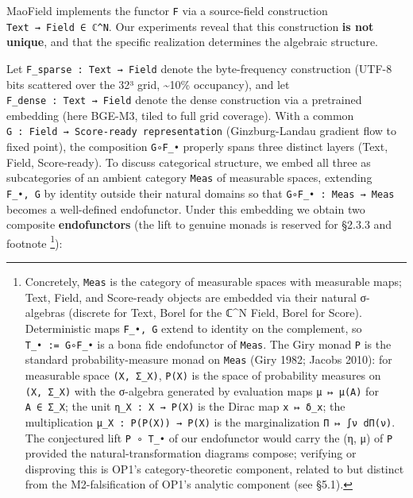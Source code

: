 \documentclass[
]{article}
\begin{document}
MaoField implements the functor \texttt{F} via a source-field
construction \texttt{Text\ →\ Field\ ∈\ ℂ\^{}N}. Our experiments reveal
that this construction \textbf{is not unique}, and that the specific
realization determines the algebraic structure.

Let \texttt{F\_sparse\ :\ Text\ →\ Field} denote the byte-frequency
construction (UTF-8 bits scattered over the 32³ grid,
\textasciitilde10\% occupancy), and let
\texttt{F\_dense\ :\ Text\ →\ Field} denote the dense construction via a
pretrained embedding (here BGE-M3, tiled to full grid coverage). With a
common \texttt{G\ :\ Field\ →\ Score-ready\ representation}
(Ginzburg-Landau gradient flow to fixed point), the composition
\texttt{G∘F\_•} properly spans three distinct layers (Text, Field,
Score-ready). To discuss categorical structure, we embed all three as
subcategories of an ambient category \texttt{Meas} of measurable spaces,
extending \texttt{F\_•,\ G} by identity outside their natural domains so
that \texttt{G∘F\_•\ :\ Meas\ →\ Meas} becomes a well-defined
endofunctor. Under this embedding we obtain two composite
\textbf{endofunctors} (the lift to genuine monads is reserved for §2.3.3
and footnote \footnote{Concretely, \texttt{Meas} is the category of
  measurable spaces with measurable maps; Text, Field, and Score-ready
  objects are embedded via their natural σ-algebras (discrete for Text,
  Borel for the ℂ\^{}N Field, Borel for Score). Deterministic maps
  \texttt{F\_•,\ G} extend to identity on the complement, so
  \texttt{T\_•\ :=\ G∘F\_•} is a bona fide endofunctor of \texttt{Meas}.
  The Giry monad \texttt{P} is the standard probability-measure monad on
  \texttt{Meas} (Giry 1982; Jacobs 2010): for measurable space
  \texttt{(X,\ Σ\_X)}, \texttt{P(X)} is the space of probability
  measures on \texttt{(X,\ Σ\_X)} with the σ-algebra generated by
  evaluation maps \texttt{μ\ ↦\ μ(A)} for \texttt{A\ ∈\ Σ\_X}; the unit
  \texttt{η\_X\ :\ X\ →\ P(X)} is the Dirac map \texttt{x\ ↦\ δ\_x}; the
  multiplication \texttt{μ\_X\ :\ P(P(X))\ →\ P(X)} is the
  marginalization \texttt{Π\ ↦\ ∫ν\ dΠ(ν)}. The conjectured lift
  \texttt{P\ ∘\ T\_•} of our endofunctor would carry the (η, μ) of
  \texttt{P} provided the natural-transformation diagrams compose;
  verifying or disproving this is OP1's category-theoretic component,
  related to but distinct from the M2-falsification of OP1's analytic
  component (see §5.1).}):
\end{document}
